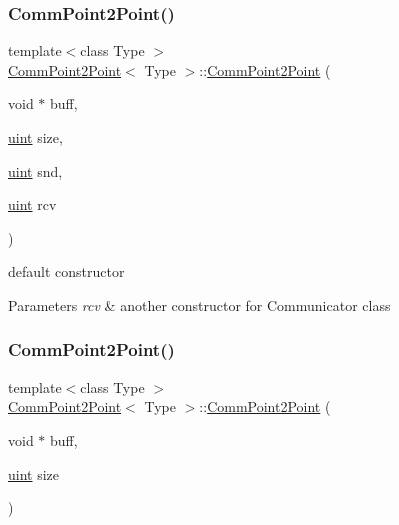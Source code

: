 \subsubsection{\texorpdfstring{Comm\+Point2\+Point()}{CommPoint2Point()}\hspace{0.1cm}{\footnotesize\ttfamily [2/3]}}
{\footnotesize\ttfamily template$<$class Type $>$ \\
\mbox{\hyperlink{classCommPoint2Point}{Comm\+Point2\+Point}}$<$ Type $>$\+::\mbox{\hyperlink{classCommPoint2Point}{Comm\+Point2\+Point}} (\begin{DoxyParamCaption}\item[{void $\ast$}]{buff,  }\item[{\mbox{\hyperlink{definitions_8h_a69aa29b598b851b0640aa225a9e5d61d}{uint}}}]{size,  }\item[{\mbox{\hyperlink{definitions_8h_a69aa29b598b851b0640aa225a9e5d61d}{uint}}}]{snd,  }\item[{\mbox{\hyperlink{definitions_8h_a69aa29b598b851b0640aa225a9e5d61d}{uint}}}]{rcv }\end{DoxyParamCaption})}

default constructor 
\begin{DoxyParams}{Parameters}
{\em rcv} & another constructor for Communicator class \\
\hline
\end{DoxyParams}
\mbox{\label{classCommPoint2Point_a7e60b9a67fcae40edaa4410425fac6ab}} 
\subsubsection{\texorpdfstring{Comm\+Point2\+Point()}{CommPoint2Point()}\hspace{0.1cm}{\footnotesize\ttfamily [3/3]}}
{\footnotesize\ttfamily template$<$class Type $>$ \\
\mbox{\hyperlink{classCommPoint2Point}{Comm\+Point2\+Point}}$<$ Type $>$\+::\mbox{\hyperlink{classCommPoint2Point}{Comm\+Point2\+Point}} (\begin{DoxyParamCaption}\item[{void $\ast$}]{buff,  }\item[{\mbox{\hyperlink{definitions_8h_a69aa29b598b851b0640aa225a9e5d61d}{uint}}}]{size }\end{DoxyParamCaption})}

